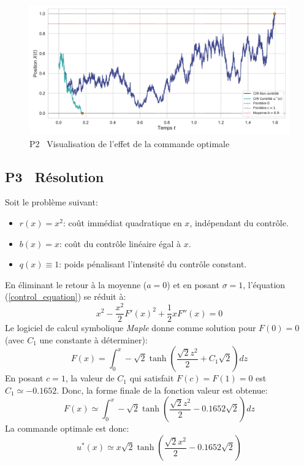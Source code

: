 \begin{figure}[htb]
    \centering
    \includegraphics[width=0.9\linewidth]{img/validation/P2/p2_control_simulation.pdf}
    \caption{P2 \textemdash~Visualisation de l'effet de la commande optimale}
\end{figure}

\subsection{P3 \textemdash~Résolution}\label{p3}
Soit le problème suivant:
\begin{itemize}
    \item $r(x) = x^2$: coût immédiat quadratique en $x$, indépendant du contrôle.
    \item $b(x) = x$: coût du contrôle linéaire égal à $x$.
    \item $q(x) \equiv 1$: poids pénalisant l'intensité du contrôle constant.
\end{itemize}
En éliminant le retour à la moyenne ($a=0$) et en posant $\sigma=1$, l'équation (\ref{control_equation}) se réduit à:
\begin{equation}\label{reduced_control_equation}
    x^2-\frac{x^2}{2}{F'(x)}^2+\frac{1}{2}xF''(x)=0
\end{equation}
Le logiciel de calcul symbolique \textit{Maple} donne comme solution pour $F(0)=0$ (avec $C_1$ une constante à déterminer):
\[
    F(x)=\int_0^x-\sqrt{2}\tanh\left(\frac{\sqrt{2}z^2}{2}+C_1\sqrt{2}\right)dz
\]
En posant $c=1$, la valeur de $C_1$ qui satisfait $F(c)=F(1)=0$ est $C_1\simeq -0.1652$. Donc, la forme finale de la fonction valeur est obtenue:
\begin{equation}\label{sol_control_3}
    F(x)\simeq \int_0^x-\sqrt{2}\tanh\left(\frac{\sqrt{2}z^2}{2}-0.1652\sqrt{2}\right)dz
\end{equation}
La commande optimale est donc:
\begin{equation}\label{optimal_control_3}
    u^*(x)\simeq x\sqrt{2}\tanh\left(\frac{\sqrt{2}x^2}{2}-0.1652\sqrt{2}\right)
\end{equation}
